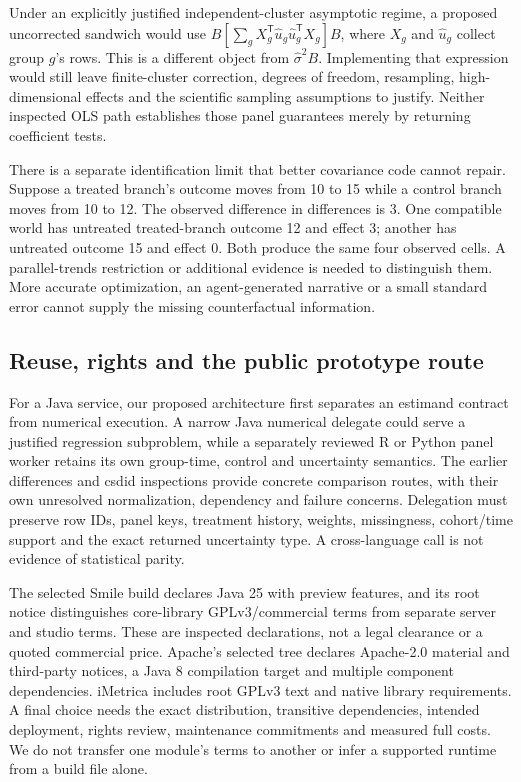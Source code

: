 Under an explicitly justified independent-cluster asymptotic regime, a proposed
uncorrected sandwich would use $B[\sum_g X_g^\mathsf{T}\widehat u_g
\widehat u_g^\mathsf{T}X_g]B$, where $X_g$ and $\widehat u_g$ collect
group $g$'s rows. This is a different object from $\widehat\sigma^2B$.
Implementing that expression would still leave finite-cluster correction,
degrees of freedom, resampling, high-dimensional effects and the scientific
sampling assumptions to justify. Neither inspected OLS path establishes
those panel guarantees merely by returning coefficient tests.
\citep{exec25_paneljava_reference,exec25_paneljava_smile,exec25_paneljava_commons}

There is a separate identification limit that better covariance code cannot
repair. Suppose a treated branch's outcome moves from 10 to 15 while a control
branch moves from 10 to 12. The observed difference in differences is 3.
One compatible world has untreated treated-branch outcome 12 and effect 3;
another has untreated outcome 15 and effect 0. Both produce the same four
observed cells. A parallel-trends restriction or additional evidence is needed
to distinguish them. More accurate optimization, an agent-generated narrative
or a small standard error cannot supply the missing counterfactual information.
\citep{exec25_paneljava_reference}

\subsection{Reuse, rights and the public prototype route}
For a Java service, our proposed architecture first separates an estimand
contract from numerical execution. A narrow Java numerical delegate could
serve a justified regression subproblem, while a separately reviewed R or
Python panel worker retains its own group-time, control and uncertainty
semantics. The earlier differences and csdid inspections provide concrete
comparison routes, with their own unresolved normalization, dependency and
failure concerns. Delegation must preserve row IDs, panel keys, treatment
history, weights, missingness, cohort/time support and the exact returned
uncertainty type. A cross-language call is not evidence of statistical parity.
\citep{exec24_panelpy_differences,exec24_panelpy_csdid,exec25_paneljava_reference}

The selected Smile build declares Java 25 with preview features, and its
root notice distinguishes core-library GPLv3/commercial terms from separate
server and studio terms. These are inspected declarations, not a legal
clearance or a quoted commercial price. Apache's selected tree declares
Apache-2.0 material and third-party notices, a Java 8 compilation target
and multiple component dependencies. iMetrica includes root GPLv3 text and
native library requirements. A final choice needs the exact distribution,
transitive dependencies, intended deployment, rights review, maintenance
commitments and measured full costs. We do not transfer one module's terms
to another or infer a supported runtime from a build file alone.
\citep{exec25_paneljava_smile,exec25_paneljava_commons,exec25_paneljava_imetrica}

